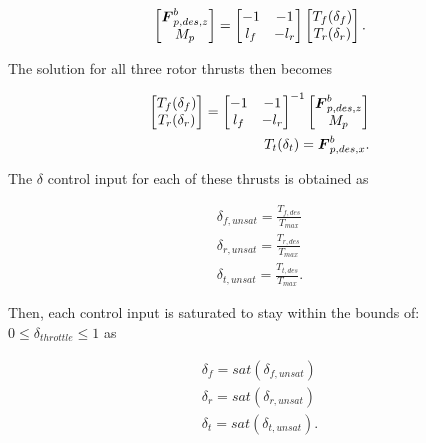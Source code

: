 \begin{align}
    \begin{bmatrix}
        \boldsymbol{F}^b_{p,des,z}\\
        M_p\\
    \end{bmatrix}
    =
    \begin{bmatrix}
        -1 & -1\\
        l_f & -l_r\\
    \end{bmatrix}
    \begin{bmatrix}
        T_f(\delta_f)\\
        T_r(\delta_r)\\
    \end{bmatrix}.
\end{align}

The solution for all three rotor thrusts then becomes

\begin{align}
    \begin{bmatrix}
        T_f(\delta_f)\\
        T_r(\delta_r)\\
    \end{bmatrix}
    =
    \begin{bmatrix}
        -1 & -1\\
        l_f & -l_r\\
    \end{bmatrix}^{-1}
    \begin{bmatrix}
        \boldsymbol{F}^b_{p,des,z}\\
        M_p\\
    \end{bmatrix}\\
    T_t(\delta_t) = \boldsymbol{F}^b_{p,des,x}.
\end{align}

The $\delta$ control input for each of these thrusts is obtained as

\begin{align}
    \delta_{f,unsat} = \frac{T_{f,des}}{T_{max}}\\
    \delta_{r,unsat} = \frac{T_{r,des}}{T_{max}}\\
    \delta_{t,unsat} = \frac{T_{t,des}}{T_{max}}.
\end{align}

Then, each control input is saturated to stay within the bounds of: $0 \leq \delta_{throttle} \leq 1$ as

\begin{align}
    \delta_f = sat(\delta_{f,unsat})\\
    \delta_r = sat(\delta_{r,unsat})\\
    \delta_t = sat(\delta_{t,unsat}).
\end{align}

